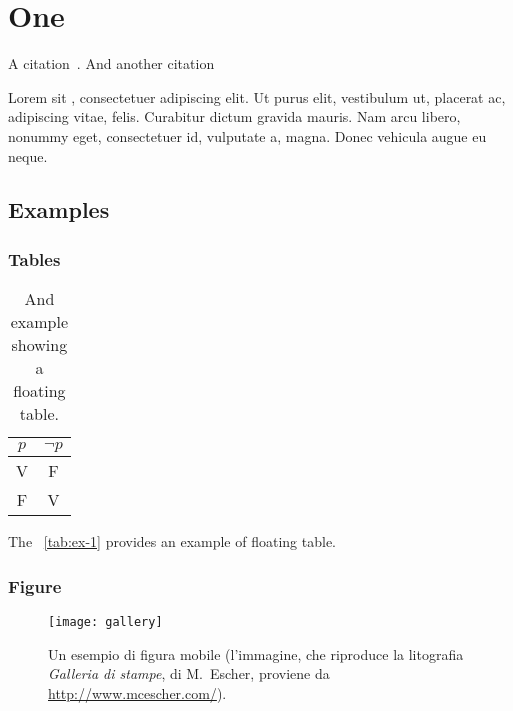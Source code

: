 
\chapter{One}
\label{cap:one}

A citation~\citep{gihman1973}. And another citation~\citep{gihman1974}

Lorem   sit , consectetuer adipiscing elit. Ut purus elit, vestibulum ut, placerat ac, adipiscing vitae, felis. Curabitur dictum gravida mauris. Nam arcu libero, nonummy eget, consectetuer id, vulputate a, magna. Donec vehicula augue eu neque.

\section{Examples}

\subsection{Tables}

\lipsum

\begin{table}[tb]
\caption[A floating table]{And example showing a floating table.}
\label{tab:ex-1}
\centering
\begin{tabular}{cc}
\toprule
$p$ & $\lnot p$ \\ 
\midrule
V   & F \\ 
F   & V \\
\bottomrule 
\end{tabular}
\end{table}

The ~\vref{tab:ex-1} provides an example of floating table.

\lipsum[1-2]

\subsection{Figure}

\lipsum[2]

\begin{figure}[tb] 
\centering 
\texttt{[image: gallery]} 
\caption[Un esempio di figura mobile]{Un esempio di figura mobile (l'immagine, che riproduce la litografia \emph{Galleria di stampe}, di M.~Escher, proviene da \url{http://www.mcescher.com/}).}
\label{fig:galleria} 
\end{figure}

